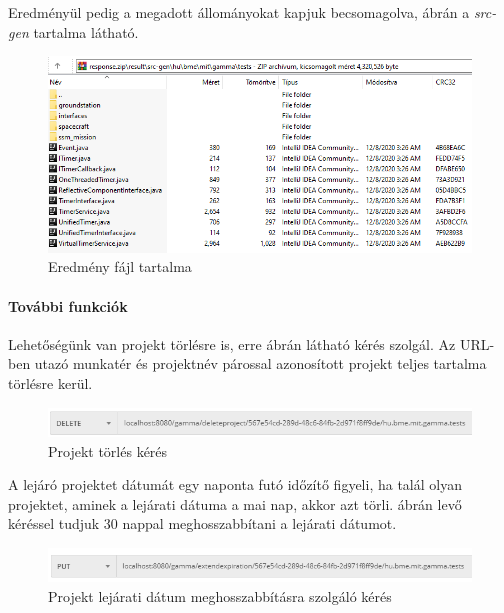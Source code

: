 Eredményül pedig a megadott állományokat kapjuk becsomagolva,  ábrán a \textit{src-gen} tartalma látható. 

\begin{figure}[!ht]
	\includegraphics[width=150mm, keepaspectratio]{figures/result_zip.PNG}
	\caption{Eredmény fájl tartalma}
	\label{fig:result_zip}
\end{figure}
\paragraph{További funkciók} Lehetőségünk van projekt törlésre is, erre  ábrán látható kérés szolgál. Az URL-ben utazó munkatér és projektnév párossal azonosított projekt teljes tartalma törlésre kerül.


\begin{figure}[!ht]
	\includegraphics[width=\textwidth, keepaspectratio]{figures/delete_project_request.PNG}
	\caption{Projekt törlés kérés}
	\label{fig:delete_project_request}
\end{figure}

A lejáró projektet dátumát egy naponta futó időzítő figyeli, ha talál olyan projektet, aminek a lejárati dátuma a mai nap, akkor azt törli.  ábrán levő kéréssel tudjuk 30 nappal meghosszabbítani a lejárati dátumot.

\begin{figure}[!ht]
	\includegraphics[width=\textwidth, keepaspectratio]{figures/extend_expiration_req.PNG}
	\caption{Projekt lejárati dátum meghosszabbításra szolgáló kérés}
	\label{fig:extend_expiration_req}
\end{figure}